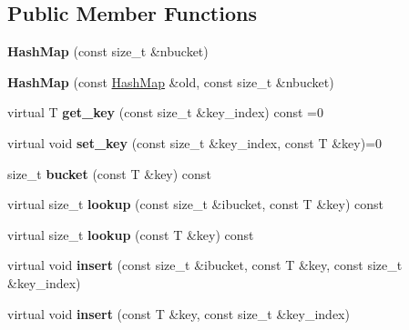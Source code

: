 \subsection*{Public Member Functions}
\begin{DoxyCompactItemize}
\item 
{\bfseries Hash\+Map} (const size\+\_\+t \&nbucket)\hypertarget{classHashMap_ad3da0496d0d5c817818cc3d0de1cde13}{}\label{classHashMap_ad3da0496d0d5c817818cc3d0de1cde13}

\item 
{\bfseries Hash\+Map} (const \hyperlink{classHashMap}{Hash\+Map} \&old, const size\+\_\+t \&nbucket)\hypertarget{classHashMap_ad084f78eb6a7208b9cc67020703ff898}{}\label{classHashMap_ad084f78eb6a7208b9cc67020703ff898}

\item 
virtual T {\bfseries get\+\_\+key} (const size\+\_\+t \&key\+\_\+index) const =0\hypertarget{classHashMap_a6449e282ff3ee559f254f4f727e9cf63}{}\label{classHashMap_a6449e282ff3ee559f254f4f727e9cf63}

\item 
virtual void {\bfseries set\+\_\+key} (const size\+\_\+t \&key\+\_\+index, const T \&key)=0\hypertarget{classHashMap_a21b01a2502b7f45dd939bab7a3811a54}{}\label{classHashMap_a21b01a2502b7f45dd939bab7a3811a54}

\item 
size\+\_\+t {\bfseries bucket} (const T \&key) const \hypertarget{classHashMap_a36df7df6b87258c2817865583569199b}{}\label{classHashMap_a36df7df6b87258c2817865583569199b}

\item 
virtual size\+\_\+t {\bfseries lookup} (const size\+\_\+t \&ibucket, const T \&key) const \hypertarget{classHashMap_a2e14b85d148e08c85f20eabfa978c185}{}\label{classHashMap_a2e14b85d148e08c85f20eabfa978c185}

\item 
virtual size\+\_\+t {\bfseries lookup} (const T \&key) const \hypertarget{classHashMap_ac4ab5ba76fcb4436e9ccdad3c7790567}{}\label{classHashMap_ac4ab5ba76fcb4436e9ccdad3c7790567}

\item 
virtual void {\bfseries insert} (const size\+\_\+t \&ibucket, const T \&key, const size\+\_\+t \&key\+\_\+index)\hypertarget{classHashMap_aab21199d4692865f989168a2bf02b7e9}{}\label{classHashMap_aab21199d4692865f989168a2bf02b7e9}

\item 
virtual void {\bfseries insert} (const T \&key, const size\+\_\+t \&key\+\_\+index)\hypertarget{classHashMap_a2e75f0e3ffc44c9b4d5821e36756395a}{}\label{classHashMap_a2e75f0e3ffc44c9b4d5821e36756395a}


\end{DoxyCompactItemize}
